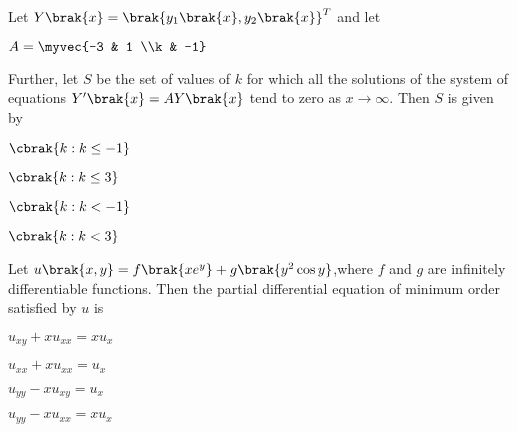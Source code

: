 \begin{enumerate}
\begin{multicols}{2}
\item {}
\item {}
\item {}
\item {}
\end{multicols}
\end{enumerate}
\item Let $Y\brak{x} = \brak{y_1\brak{x}, y_2\brak{x}}^T$ and let \\ \begin{center}$A = \myvec{-3 & 1 \\k & -1}$ \end{center}Further, let $S$ be the set of values of $k$ for which all the solutions of the system of equations $Y^{\prime}\brak{x} = A Y\brak{x}$ tend to zero as $x \rightarrow \infty$. Then $S$ is given by
\begin{enumerate}
\begin{multicols}{2}
\item $\cbrak{k: k \leq -1}$
\item $\cbrak{k: k \leq 3}$
\item $\cbrak{k: k < -1}$
\item $\cbrak{k: k < 3}$
\end{multicols}
\end{enumerate}
\item Let $u\brak{x, y} = f\brak{xe^y} + g\brak{y^2 \cos y}$,where $f$ and $g$ are infinitely differentiable functions. Then the partial differential equation of minimum order satisfied by $u$ is
\begin{enumerate}
\begin{multicols}{2}
\item  $ u_{xy} + xu_{xx} = xu_x $
\item $ u_{xx} + xu_{xx} = u_x $
\item $ u_{yy} - xu_{xy} = u_x $
\item $ u_{yy} - xu_{xx} = xu_x $
\end{multicols}
\end{enumerate}
